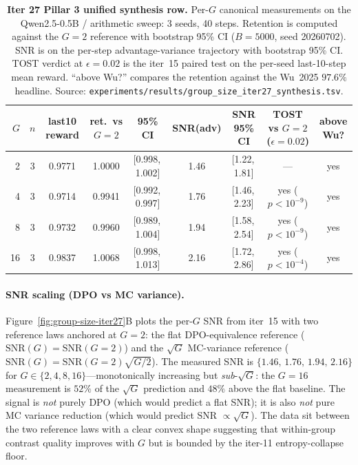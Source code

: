 \begin{table}[htbp]
\centering
\small
\begin{tabular}{rcccccccc}
\hline
$G$ & $n$ & last10 reward & ret.\ vs $G{=}2$ & 95\% CI & SNR(adv) & SNR 95\% CI & TOST vs $G{=}2$ ($\epsilon{=}0.02$) & above Wu? \\
\hline
2  & 3 & 0.9771 & 1.0000 & [0.998,\,1.002] & 1.46 & [1.22,\,1.81] & --- & yes \\
4  & 3 & 0.9714 & 0.9941 & [0.992,\,0.997] & 1.76 & [1.46,\,2.23] & yes ($p<10^{-9}$)  & yes \\
8  & 3 & 0.9732 & 0.9960 & [0.989,\,1.004] & 1.94 & [1.58,\,2.54] & yes ($p<10^{-9}$)  & yes \\
16 & 3 & 0.9837 & 1.0068 & [0.998,\,1.013] & 2.16 & [1.72,\,2.86] & yes ($p<10^{-4}$)  & yes \\
\hline
\end{tabular}
\caption{\textbf{Iter 27 Pillar 3 unified synthesis row.} Per-$G$
canonical measurements on the Qwen2.5-0.5B / arithmetic sweep: 3 seeds,
40 steps. Retention is computed against the $G{=}2$ reference with
bootstrap 95\% CI ($B{=}5000$, seed 20260702). SNR is on the per-step
advantage-variance trajectory with bootstrap 95\% CI. TOST verdict at
$\epsilon{=}0.02$ is the iter~15 paired test on the per-seed
last-10-step mean reward. ``above Wu?'' compares the retention against
the Wu~2025 $97.6\%$ headline. Source:
\texttt{experiments/results/group\_size\_iter27\_synthesis.tsv}.}
\label{tab:groupsize-iter27-synthesis}
\end{table}

\paragraph{SNR scaling (DPO vs MC variance).}
Figure~\ref{fig:group-size-iter27}B plots the per-$G$ SNR from
iter~15 with two reference laws anchored at $G{=}2$: the flat
DPO-equivalence reference ($\text{SNR}(G) = \text{SNR}(G{=}2)$) and the
$\sqrt{G}$ MC-variance reference ($\text{SNR}(G) = \text{SNR}(G{=}2)
\sqrt{G/2}$). The measured SNR is $\{1.46,\,1.76,\,1.94,\,2.16\}$
for $G\in\{2,4,8,16\}$---monotonically increasing but \emph{sub}-$\sqrt{G}$:
the $G{=}16$ measurement is $52\%$ of the $\sqrt{G}$ prediction
and $48\%$ above the flat baseline. The signal is \emph{not} purely
DPO (which would predict a flat SNR); it is also \emph{not} pure MC
variance reduction (which would predict SNR $\propto \sqrt{G}$). The
data sit between the two reference laws with a clear convex shape
suggesting that within-group contrast quality improves with $G$ but is
bounded by the iter-11 entropy-collapse floor.

